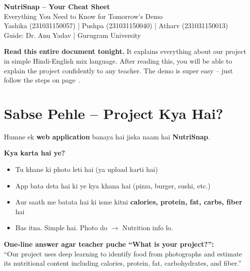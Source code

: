 \documentclass[11pt,a4paper]{article}
\begin{document}

\begin{center}
{\LARGE \textbf{NutriSnap -- Your Cheat Sheet}}\\[0.4cm]
{\large Everything You Need to Know for Tomorrow's Demo}\\[0.3cm]
{\normalsize Yashika (231031150057) | Pushpa (231031150040) | Atharv (231031150013)}\\[0.15cm]
{\normalsize Guide: Dr. Anu Yadav | Gurugram University}\\[0.5cm]
\end{center}

\begin{warnbox}
\textbf{Read this entire document tonight.} It explains everything about our project in simple Hindi-English mix language. After reading this, you will be able to explain the project confidently to any teacher. The demo is super easy -- just follow the steps on page~\pageref{sec:demo}.
\end{warnbox}

\vspace{0.3cm}

\section{Sabse Pehle -- Project Kya Hai?}

Humne ek \textbf{web application} banaya hai jiska naam hai \textbf{NutriSnap}.

\textbf{Kya karta hai ye?}
\begin{itemize}[leftmargin=1.2cm]
\item Tu khane ki photo leti hai (ya upload karti hai)
\item App bata deta hai ki ye kya khana hai (pizza, burger, sushi, etc.)
\item Aur saath me batata hai ki isme kitni \textbf{calories, protein, fat, carbs, fiber} hai
\item Bas itna. Simple hai. Photo do $\rightarrow$ Nutrition info lo.
\end{itemize}

\begin{tipbox}
\textbf{One-line answer agar teacher puche ``What is your project?'':}\\[0.2cm]
``Our project uses deep learning to identify food from photographs and estimate its nutritional content including calories, protein, fat, carbohydrates, and fiber.''
\end{tipbox}
\end{document}
